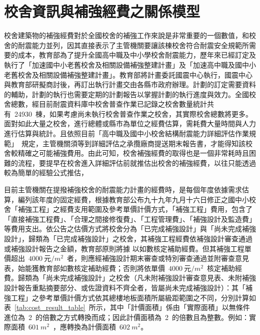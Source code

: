 \renewcommand\thetable{\arabic{chapter}-\arabic{table}}
\chapter{校舍資訊與補強經費之關係模型}
\label{cha:cob} 

校舍建築物的補強經費對於全國校舍的補強工作來說是非常重要的一個數值，和校舍的耐震能力並列，因其直接表示了主管機關要讓該棟校舍符合耐震安全規範所需要的成本，教育部為了提升全國高中職及中小學校舍耐震能力，歷年來已經訂定及執行了「加速國中小老舊校舍及相關設備補強整建計畫」及「加速高中職及國中小老舊校舍及相關設備補強整建計畫」。教育部將計畫委託國震中心執行，國震中心與教育部研擬商討後，再訂出執行計畫交由各縣市政府辦理。計劃的訂定需要資料的輔助，計劃的執行也需要定期的計劃報告以掌握計劃的執行進度與效力。全國校舍總數，經目前耐震資料庫中校舍普查作業已記錄之校舍數量統計共有~24930~棟，如果考慮尚未執行校舍普查作業之校舍，其實際校舍總數將更多。面對如此大量之校舍，進行總體或縣市為單位之經費估算，需耗費大量時間與人力進行估算與統計。且依照目前「高中職及國中小校舍結構耐震能力詳細評估作業規範」\cite{ncree2013moe}~規定，主管機關須等到詳細評估之承攬廠商提送期末報告書，才能得知該校舍較精確之可能補強費用。由此可知，校舍補強經費的取得也是一個非常耗時且困難的流程，要提早在校舍進入詳細評估前就推估出校舍的補強經費，以往只能透過較為簡單的經驗公式推估，

目前主管機關在提撥補強校舍的耐震能力計畫的經費時，是每個年度依據需求估算，編列該年度的固定經費，根據教育部公布九十九年九月十六日修正之國中小校舍「補強工程」之經費支用範圍及參考單價計價方式，「補強工程」費用，包含了「直接補強工程費」、「合理之間接修復費」、「工程管理費」、「補強設計及監造費」等費用支出。依公告之估價方式將校舍分為「已完成補強設計」與「尚未完成補強設計」，歸類為「已完成補強設計」之校舍，其補強工程經費依補強設計審查通過或補強設計報告之金額，教育部原則將據 以如數核定補助經費。但其補強工程單價超出~$4000~\text{元}/m^2$~者，則應經補強設計期末審查或特別審查通過並附審查意見表，始能獲教育部如數核定補助經費；否則將依單價~$4000~\text{元}/m^2$~核定補助經費。歸類為「尚未完成補強設計」之校舍（凡未附補強設計審查意見表、未附補強設計報告重點摘要部分、或佐證資料不齊全者，皆屬尚未完成補強設計）：其「補強工程」之參考單價計價方式依其總樓地板面積所屬級距範圍之不同，分別計算如表~\ref{tab:cost_result_table}\cite{ncree2010moe}~所示，其中「計價面積」係由「實際面積」以無條件進位為~2~的倍數之方式轉換而成；因此計價面積為~2~的倍數且為整數。例如：實際面積~$601~m^2$~，應轉換為計價面積~$602~m^2$。

